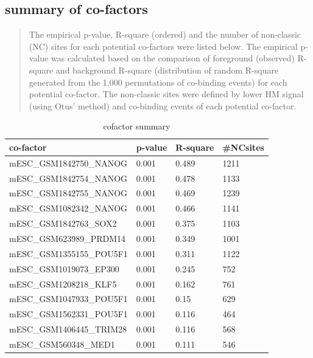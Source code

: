 \documentclass[11pt,a4paper]{article}
\begin{document}
\subsection{summary of co-factors}
\begin{quotation}
The empirical p-value, R-square (ordered) and the number of non-classic (NC) sites for each potential co-factors were listed below. The empirical p-value was calculated based on the comparison of foreground (observed) R-square and background R-square (distribution of random R-square generated from the 1,000 permutations of co-binding events) for each potential co-factor. The non-classic sites were defined by lower HM signal (using Otus' method) and co-binding events of each potential co-factor.
\end{quotation}
\begin{table}[h]
\caption{cofactor summary}\label{bstable}
\begin{tabularx}{\textwidth}{ |l|X|X|X| }
    
\hline
co-factor & p-value & R-square & \#NCsites \\
\hline
mESC\_GSM1842750\_NANOG & 0.001 & 0.489 & 1211 \\
\hline
mESC\_GSM1842754\_NANOG & 0.001 & 0.478 & 1133 \\
\hline
mESC\_GSM1842755\_NANOG & 0.001 & 0.469 & 1239 \\
\hline
mESC\_GSM1082342\_NANOG & 0.001 & 0.466 & 1141 \\
\hline
mESC\_GSM1842763\_SOX2 & 0.001 & 0.375 & 1103 \\
\hline
mESC\_GSM623989\_PRDM14 & 0.001 & 0.349 & 1001 \\
\hline
mESC\_GSM1355155\_POU5F1 & 0.001 & 0.311 & 1122 \\
\hline
mESC\_GSM1019073\_EP300 & 0.001 & 0.245 & 752 \\
\hline
mESC\_GSM1208218\_KLF5 & 0.001 & 0.162 & 761 \\
\hline
mESC\_GSM1047933\_POU5F1 & 0.001 & 0.15 & 629 \\
\hline
mESC\_GSM1562331\_POU5F1 & 0.001 & 0.116 & 464 \\
\hline
mESC\_GSM1406445\_TRIM28 & 0.001 & 0.116 & 568 \\
\hline
mESC\_GSM560348\_MED1 & 0.001 & 0.111 & 546 \\

\hline
\end{tabularx}
\end{table}
\newpage
\newpage
\end{document}
